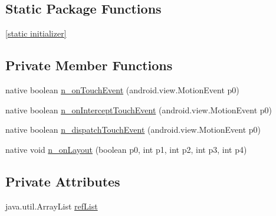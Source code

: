 \subsection*{Static Package Functions}
\begin{CompactItemize}
\item 
\hyperlink{classmd5b60ffeb829f638581ab2bb9b1a7f4f3f_1_1_visual_element_renderer__1_3ae26bd8575212fb6d6f14487b4f48d4}{\mbox{[}static initializer\mbox{]}}
\end{CompactItemize}
\subsection*{Private Member Functions}
\begin{CompactItemize}
\item 
native boolean \hyperlink{classmd5b60ffeb829f638581ab2bb9b1a7f4f3f_1_1_visual_element_renderer__1_bf46ffd446313b87383a085a60d65dd4}{n\_\-onTouchEvent} (android.view.MotionEvent p0)
\item 
native boolean \hyperlink{classmd5b60ffeb829f638581ab2bb9b1a7f4f3f_1_1_visual_element_renderer__1_a5005d8febce3d07df2d375121e1b6ca}{n\_\-onInterceptTouchEvent} (android.view.MotionEvent p0)
\item 
native boolean \hyperlink{classmd5b60ffeb829f638581ab2bb9b1a7f4f3f_1_1_visual_element_renderer__1_ecca707bf9b175721aeea8b3018d9c9a}{n\_\-dispatchTouchEvent} (android.view.MotionEvent p0)
\item 
native void \hyperlink{classmd5b60ffeb829f638581ab2bb9b1a7f4f3f_1_1_visual_element_renderer__1_93658aeaafe1fbcb5301e4b9cbf9f833}{n\_\-onLayout} (boolean p0, int p1, int p2, int p3, int p4)
\end{CompactItemize}
\subsection*{Private Attributes}
\begin{CompactItemize}
\item 
java.util.ArrayList \hyperlink{classmd5b60ffeb829f638581ab2bb9b1a7f4f3f_1_1_visual_element_renderer__1_4ebd0e42ebd360712eb189930036fc9f}{refList}
\end{CompactItemize}


